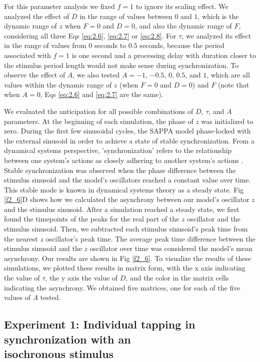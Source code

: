 \documentclass{report}
\begin{document}
For this parameter analysis we fixed $f = 1$ to ignore its scaling effect. We analyzed the effect of $D$ in the range of values between $0$ and $1$, which is the dynamic range of $z$ when $F = 0$ and $D = 0$, and also the dynamic range of $F$, considering all three Eqs \eqref{eq:2.6}, \eqref{eq:2.7} or \eqref{eq:2.8}. For $\tau$, we analyzed its effect in the range of values from $0$ seconds to $0.5$ seconds, because the period associated with $f = 1$ is one second and a processing delay with duration closer to the stimulus period length would not make sense during synchronization. To observe the effect of $A$, we also tested $A = -1$, $-0.5$, $0$, $0.5$, and $1$, which are all values within the dynamic range of $z$ (when $F = 0$ and $D = 0$) and $F$ (note that when $A = 0$, Eqs \eqref{eq:2.6} and \eqref{eq:2.7} are the same).

We evaluated the anticipation for all possible combinations of $D$, $\tau$, and $A$ parameters. At the beginning of each simulation, the phase of $z$ was initialized to zero. During the first few sinusoidal cycles, the SAPPA model phase-locked with the external sinusoid in order to achieve a state of stable synchronization. From a dynamical systems perspective, 'synchronization' refers to the relationship between one system's actions as closely adhering to another system's actions \cite{pecora1990synchronization}. Stable synchronization was observed when the phase difference between the stimulus sinusoid and the model's oscillators reached a constant value over time. This stable mode is known in dynamical systems theory as a steady state. Fig \ref{f2_6}D shows how we calculated the asynchrony between our model's oscillator $z$ and the stimulus sinusoid. After a simulation reached a steady state, we first found the timepoints of the peaks for the real part of the $z$ oscillator and the stimulus sinusoid. Then, we subtracted each stimulus sinusoid's peak time from the nearest $z$ oscillator's peak time. The average peak time difference between the stimulus sinusoid and the $z$ oscillator over time was considered the model's mean asynchrony. Our results are shown in Fig \ref{f2_6}. To visualize the results of these simulations, we plotted these results in matrix form, with the x axis indicating the value of $\tau$, the y axis the value of $D$, and the color in the matrix cells indicating the asynchrony. We obtained five matrices, one for each of the five values of $A$ tested.

\subsection{Experiment 1: Individual tapping in synchronization with an \\ isochronous stimulus}
\end{document}
